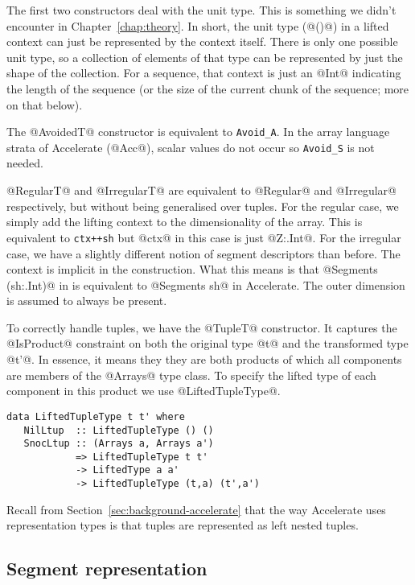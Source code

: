 The first two constructors deal with the unit type. This is something we didn't encounter in Chapter~\ref{chap:theory}. In short, the unit type (@()@) in a lifted context can just be represented by the context itself. There is only one possible unit type, so a collection of elements of that type can be represented by just the shape of the collection. For a sequence, that context is just an @Int@ indicating the length of the sequence (or the size of the current chunk of the sequence; more on that below).

The @AvoidedT@ constructor is equivalent to \lstinline[style=ndp]{Avoid_A}. In the array language strata of Accelerate (@Acc@), scalar values do not occur so \lstinline[style=ndp]{Avoid_S} is not needed.

@RegularT@ and @IrregularT@ are equivalent to @Regular@ and @Irregular@ respectively, but without being generalised over tuples. For the regular case, we simply add the lifting context to the dimensionality of the array. This is equivalent to \lstinline[style=ndp]{ctx++sh} but @ctx@ in this case is just @Z:.Int@. For the irregular case, we have a slightly different notion of segment descriptors than before. The context is implicit in the construction. What this means is that @Segments (sh:.Int)@ in \ndp{} is equivalent to @Segments sh@ in Accelerate. The outer dimension is assumed to always be present.

To correctly handle tuples, we have the @TupleT@ constructor. It captures the @IsProduct@ constraint on both the original type @t@ and the transformed type @t'@. In essence, it means they they are both products of which all components are members of the @Arrays@ type class. To specify the lifted type of each component in this product we use @LiftedTupleType@.
%
\begin{lstlisting}
data LiftedTupleType t t' where
   NilLtup  :: LiftedTupleType () ()
   SnocLtup :: (Arrays a, Arrays a')
            => LiftedTupleType t t'
            -> LiftedType a a'
            -> LiftedTupleType (t,a) (t',a')
\end{lstlisting}
%
Recall from Section~\ref{sec:background-accelerate} that the way Accelerate uses representation types is that tuples are represented as left nested tuples.

\subsection{Segment representation}

